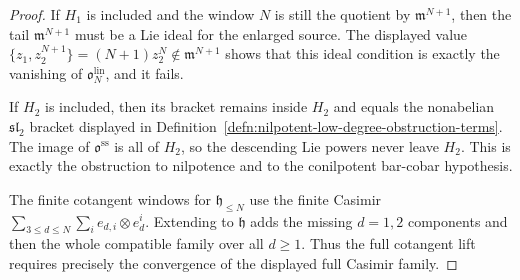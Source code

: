 \begin{proof}
  If \(H_1\) is included and the window \(N\) is still the quotient by
  \(\mathfrak m^{N+1}\), then the tail
  \(\mathfrak m^{N+1}\) must be a Lie ideal for the enlarged source.
  The displayed value
  \(\{z_1,z_2^{N+1}\}=(N+1)z_2^N\notin\mathfrak m^{N+1}\)
  shows that this ideal condition is exactly the vanishing of
  \(\mathfrak o^{\mathrm{lin}}_N\), and it fails.

  If \(H_2\) is included, then its bracket remains inside \(H_2\) and
  equals the nonabelian \(\mathfrak{sl}_2\) bracket displayed in
  Definition~\ref{defn:nilpotent-low-degree-obstruction-terms}.  The
  image of \(\mathfrak o^{\mathrm{ss}}\) is all of \(H_2\), so the
  descending Lie powers never leave \(H_2\).  This is exactly the
  obstruction to nilpotence and to the conilpotent bar-cobar hypothesis.

  The finite cotangent windows for
  \(\mathfrak h_{\leq N}\) use the finite Casimir
  \(\sum_{3\leq d\leq N}\sum_i e_{d,i}\otimes e_d^i\).  Extending to
  \(\mathfrak h\) adds the missing \(d=1,2\) components and then the
  whole compatible family over all \(d\geq1\).  Thus the full
  cotangent lift requires precisely the convergence of the displayed
  full Casimir family.
\end{proof}

